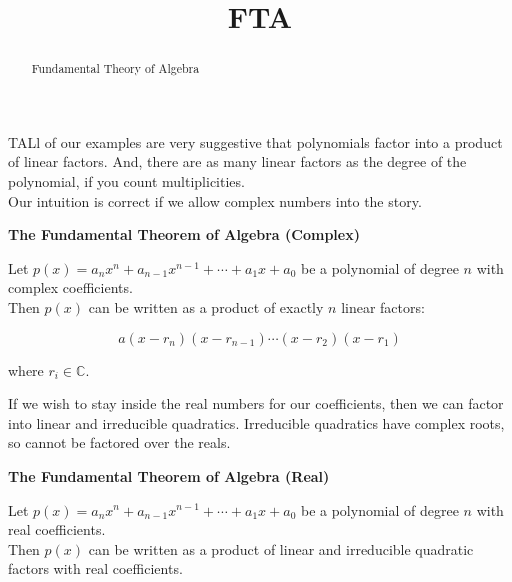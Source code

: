 \documentclass{ximera}
\title{FTA}
\begin{document}
\begin{abstract}
Fundamental Theory of Algebra
\end{abstract}
\maketitle






TALl of our examples are very suggestive that polynomials factor into a product of linear factors.  And, there are as many linear factors as the degree of the polynomial, if you count multiplicities. \\



Our intuition is correct if we allow complex numbers into the story. 


\begin{theorem} \textbf{\textcolor{green!50!black}{The Fundamental Theorem of Algebra (Complex)}} 



Let $p(x) = a_n x^n + a_{n-1} x^{n-1} + \cdots + a_1 x + a_0$ be a polynomial of degree $n$ with complex coefficients. \\


Then $p(x)$ can be written as a product of exactly $n$ linear factors:

\[
 a (x - r_n) (x - r_{n-1}) \cdots (x - r_2)  (x - r_1) 
\]


where $r_i \in \mathbb{C}$.


\end{theorem}




If we wish to stay inside the real numbers for our coefficients, then we can factor into linear and irreducible quadratics.  Irreducible quadratics have complex roots, so cannot be factored over the reals.



\begin{theorem} \textbf{\textcolor{green!50!black}{The Fundamental Theorem of Algebra (Real)}} 



Let $p(x) = a_n x^n + a_{n-1} x^{n-1} + \cdots + a_1 x + a_0$ be a polynomial of degree $n$ with real coefficients. \\


Then $p(x)$ can be written as a product of linear and irreducible quadratic factors with real coefficients.


\end{theorem}
\end{document}
